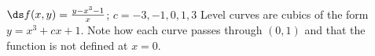 {$\ds f(x,y) = \frac{y-x^3-1}{x}$; $c = -3,-1,0,1,3$}
{Level curves are cubics of the form $y=x^3+cx+1$. Note how each curve passes through $(0,1)$ and that the function is not defined at $x=0$.\\
}